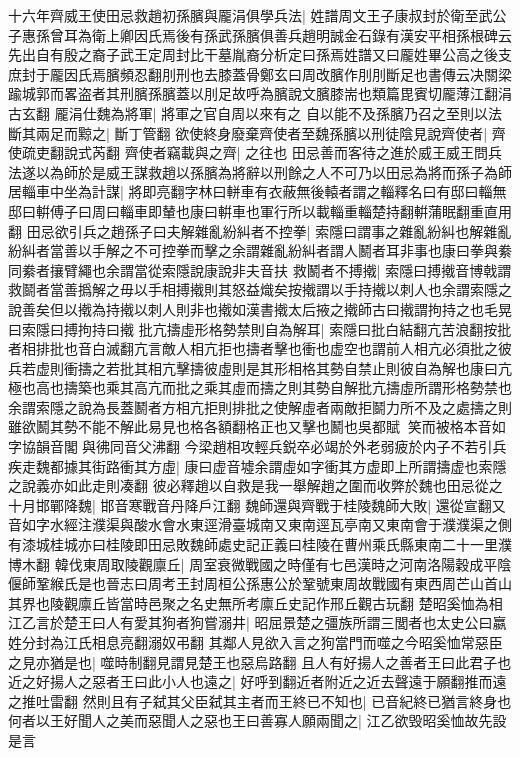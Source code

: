 十六年齊威王使田忌救趙初孫臏與龎涓俱學兵法|{
	姓譜周文王子康叔封於衛至武公子惠孫曾耳為衛上卿因氏焉後有孫武孫臏俱善兵趙明誠金石錄有漢安平相孫根碑云先出自有殷之裔子武王定周封比干墓胤裔分析定曰孫焉姓譜又曰龎姓畢公高之後支庶封于龎因氏焉臏頻忍翻刖刑也去膝蓋骨鄭玄曰周改臏作刖刖斷足也書傳云决關梁踰城郭而畧盗者其刑臏孫臏蓋以刖足故呼為臏說文臏膝耑也類篇毘賓切龎薄江翻涓古玄翻}
龎涓仕魏為將軍|{
	將軍之官自周以來有之}
自以能不及孫臏乃召之至則以法斷其兩足而黥之|{
	斷丁管翻}
欲使終身廢棄齊使者至魏孫臏以刑徒陰見說齊使者|{
	齊使疏吏翻說式芮翻}
齊使者竊載與之齊|{
	之往也}
田忌善而客待之進於威王威王問兵法遂以為師於是威王謀救趙以孫臏為將辭以刑餘之人不可乃以田忌為將而孫子為師居輜車中坐為計謀|{
	將即亮翻字林曰軿車有衣蔽無後轅者謂之輜釋名曰有邸曰輜無邸曰輧傅子曰周曰輜車即輦也康曰輧車也軍行所以載輜重輜楚持翻輧蒲眠翻重直用翻}
田忌欲引兵之趙孫子曰夫解雜亂紛糾者不控拳|{
	索隱曰謂事之雜亂紛糾也解雜亂紛糾者當善以手解之不可控拳而擊之余謂雜亂紛糾者謂人鬭者耳非事也康曰拳與絭同絭者攘臂繩也余謂當從索隱說康說非夫音扶}
救鬭者不搏撠|{
	索隱曰搏撠音博戟謂救鬬者當善撝解之毋以手相搏撠則其怒益熾矣按撠謂以手持撠以刺人也余謂索隱之說善矣但以撠為持撠以刺人則非也撠如漢書撠太后掖之撠師古曰撠謂拘持之也毛晃曰索隱曰搏拘持曰撠}
批亢擣虛形格勢禁則自為解耳|{
	索隱曰批白結翻亢苦浪翻按批者相排批也音白滅翻亢言敵人相亢拒也擣者擊也衝也虚空也謂前人相亢必須批之彼兵若虚則衝擣之若批其相亢擊擣彼虛則是其形相格其勢自禁止則彼自為解也康曰亢極也高也擣築也乘其高亢而批之乘其虛而擣之則其勢自解批亢擣虛所謂形格勢禁也余謂索隱之說為長蓋鬭者方相亢拒則排批之使解虛者兩敵拒鬬力所不及之處擣之則雖欲鬭其勢不能不解此易見也格各額翻格正也又擊也鬭也吳都賦笑而被格本音如字協韻音閣與彿同音父沸翻}
今梁趙相攻輕兵鋭卒必竭於外老弱疲於内子不若引兵疾走魏都據其街路衝其方虛|{
	康曰虚音墟余謂虛如字衝其方虚即上所謂擣虚也索隱之說義亦如此走則凑翻}
彼必釋趙以自救是我一舉解趙之圍而收弊於魏也田忌從之十月邯鄲降魏|{
	邯音寒戰音丹降戶江翻}
魏師還與齊戰于桂陵魏師大敗|{
	還從宣翻又音如字水經注濮渠與酸水會水東逕滑臺城南又東南逕瓦亭南又東南會于濮濮渠之側有漆城桂城亦曰桂陵即田忌敗魏師處史記正義曰桂陵在曹州乘氏縣東南二十一里濮博木翻}
韓伐東周取陵觀廪丘|{
	周室衰微戰國之時僅有七邑漢時之河南洛陽穀成平陰偃師鞏緱氏是也晉志曰周考王封周桓公孫惠公於鞏號東周故戰國有東西周芒山首山其界也陵觀廪丘皆當時邑聚之名史無所考廪丘史記作邢丘觀古玩翻}
楚昭奚恤為相江乙言於楚王曰人有愛其狗者狗嘗溺井|{
	昭屈景楚之彊族所謂三閭者也太史公曰嬴姓分封為江氏相息亮翻溺奴弔翻}
其鄰人見欲入言之狗當門而噬之今昭奚恤常惡臣之見亦猶是也|{
	噬時制翻見謂見楚王也惡烏路翻}
且人有好揚人之善者王曰此君子也近之好揚人之惡者王曰此小人也遠之|{
	好呼到翻近者附近之近去聲遠于願翻推而遠之推吐雷翻}
然則且有子弑其父臣弑其主者而王終已不知也|{
	已音紀終已猶言終身也}
何者以王好聞人之美而惡聞人之惡也王曰善寡人願兩聞之|{
	江乙欲毁昭奚恤故先設是言}


